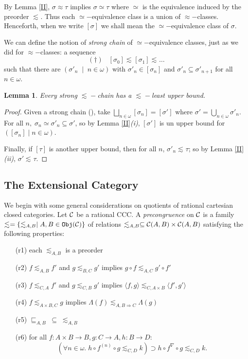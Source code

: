 \documentclass[11pt]{article}
\newtheorem{lemma}[theorem]{Lemma}
\newcommand{\Ip}[1]{\lesssim_{#1}}
\newcommand{\lang}{\langle}
\newcommand{\rang}{\rangle}
\begin{document}
By Lemma \ref{II}, $\sigma\approx\tau$ implies $\sigma\simeq\tau$ where
$\simeq$ is the equivalence induced by the preorder $\Ip{}$. Thus each
$\simeq-$equivalence class is a union of
$\approx-$classes. Henceforth, when we write $[\sigma]$ we shall mean
the $\simeq-$equivalence class of $\sigma$.

We can define the notion of {\em strong chain} of $\simeq-$equivalence
classes, just as we did for $\approx-$classes:
a sequence
$$ (\dag) \;\;\; [\sigma_0]\Ip{}[\sigma_1]\Ip{}\dots $$
such that there are $(\sigma'_n\;\mid\; n\in\omega)$ with
$\sigma'_n\in[\sigma_n]$ and $\sigma'_n\subseteq \sigma'_{n+1}$ for
all $n\in\omega$.

\begin{lemma}\label{Strong}
Every strong $\Ip{}-$chain has a $\Ip{}-$least upper bound.
\end{lemma}
\begin{proof} Given a strong chain (\dag), take
$\bigsqcup_{n\in\omega} [\sigma_n]=[\sigma']$ where
$\sigma'=\bigcup_{n\in\omega}\sigma'_n$. For all $n,\;
\sigma_n\simeq\sigma'_n\subseteq \sigma'$, so by Lemma
\ref{II}{\it(i)}, $[\sigma']$ is un upper bound for
$([\sigma_n]\mid n\in\omega)$.

Finally, if $[\tau]$ is another upper bound, then for all $n$,
$\sigma'_n\Ip{}\tau$; so by Lemma \ref{II}{\it (ii)},
$\sigma'\Ip{}\tau$.
\end{proof}


\subsection{The Extensional Category }

We begin with some general considerations on quotients of rational cartesian
closed categories. Let $\cal C$ be a rational CCC. A {\em precongruence}
on $\cal C$ is a family
$\Ip{} =\{ \Ip{A,B} \mid A,B\in{\tt Obj}({\cal C})\}$ of
relations $\Ip{A,B}\subseteq {\cal C}(A,B)\times {\cal C}(A,B)$ satisfying
the following properties:
\begin{itemize}
\item[(r1)] each $\Ip{A,B}$ is a preorder
\item[(r2)] $f\Ip{A,B} f'$ and $g\Ip{B,C} g'$ implies
$g\circ f\Ip{A,C} g'\circ f'$
\item[(r3)] $f\Ip{C,A} f'$ and $g\Ip{C,B} g'$ implies
$\lang f,g\rang \Ip{C,A\times B}\lang f',g'\rang $
\item[(r4)] $f\Ip{A\times B,C} g$ implies $\Lambda(f)\Ip{A,B\Rightarrow C}
\Lambda(g)$
\item[(r5)] $\sqsubseteq_{A,B}\;  \subseteq \; \Ip{A,B}$
\item[(r6)] for all $f:A\times B\rightarrow B, g:C\rightarrow A,
h:B\rightarrow D$:
$$(\forall n\in\omega.\; h\circ f^{(n)}\circ g\Ip{C,D} k ) \supset
h\circ f^{\nabla}\circ g\Ip{C,D} k.$$
\end{itemize}
\end{document}
